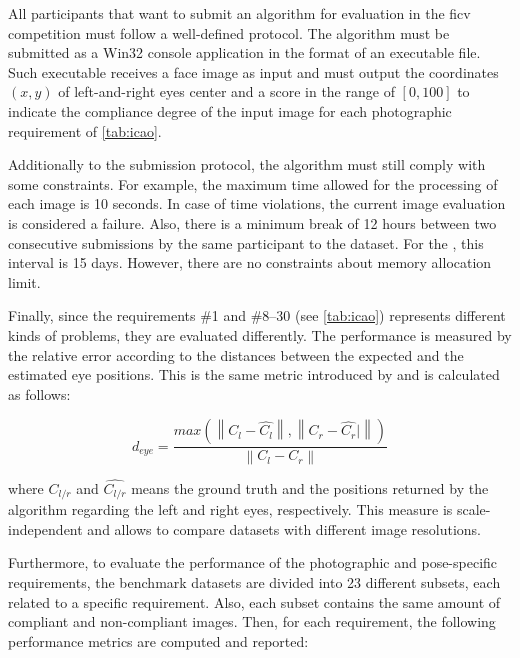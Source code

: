 All participants that want to submit an algorithm for evaluation in the \acs{ficv} competition must follow a well-defined protocol. The algorithm must be submitted as a Win32 console application in the format of an executable file. Such executable receives a face image as input and must output the coordinates $(x, y)$ of left-and-right eyes center and a score in the range of $[0, 100]$ to indicate the compliance degree of the input image for each photographic requirement of \autoref{tab:icao}.

Additionally to the submission protocol, the algorithm must still comply with some constraints. For example, the maximum time allowed for the processing of each image is 10 seconds. In case of time violations, the current image evaluation is considered a failure. Also, there is a minimum break of 12 hours between two consecutive submissions by the same participant to the \ficvtest dataset. For the \ficvofficial, this interval is 15 days. However, there are no constraints about memory allocation limit.

Finally, since the requirements \#1 and \#8--30 (see \autoref{tab:icao}) represents different kinds of problems, they are evaluated differently. The \citeReq{\eyecenterlocation} performance is measured by the relative error according to the distances between the expected and the estimated eye positions. This is the same metric introduced by \cite{jesorsky2001robust} and is calculated as follows:

\begin{equation}
\label{eq:icao-eyes}
d_{eye} = \frac{max(\left\| C_l - \hat{C_l} \right\|, \left\| C_r -\hat{C_r}|\right\|)}{\left\| C_l - C_r \right\|}
\end{equation}

\noindent
where $C_{l/r}$ and $\hat{C_{l/r}}$ means the ground truth and the positions returned by the algorithm regarding the left and right eyes, respectively. This measure is scale-independent and allows to compare datasets with different image resolutions.

Furthermore, to evaluate the performance of the photographic and pose-specific requirements, the benchmark datasets are divided into 23 different subsets, each related to a specific requirement. Also, each subset contains the same amount of compliant and non-compliant images. Then, for each requirement, the following performance metrics are computed and reported:

